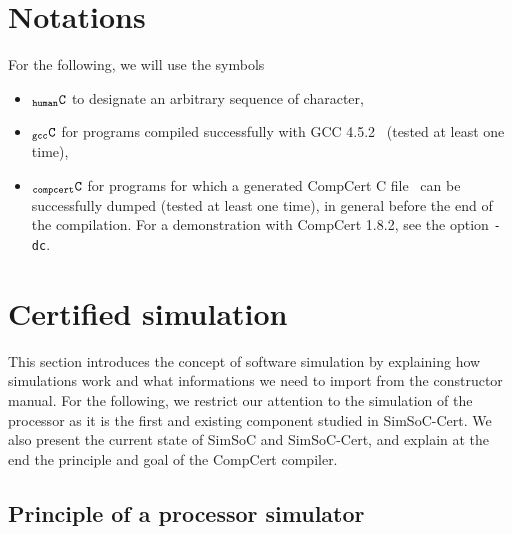 \documentclass[a4paper, 11pt]{article}
\newcommand{\gcc}{GCC 4.5.2\xspace}
\newcommand{\compcert}{CompCert 1.8.2\xspace}
\newcommand{\C}{$_{\tt compcert}{\tt C}$\xspace}
\newcommand{\gccC}{$_{\tt gcc}{\tt C}$\xspace}
\newcommand{\hC}{$_{\tt human}{\tt C}$\xspace}
\newcommand{\simsoc}{SimSoC\xspace}
\newcommand{\SScert}{SimSoC-Cert\xspace}
\begin{document}
\section*{Notations}
For the following, we will use the symbols
\begin{itemize}
\item \hC to designate an arbitrary sequence of character, 
\item \gccC for programs compiled successfully with \gcc~\cite{gcc} (tested at least one time),
\item \C for programs for which a generated CompCert C file~\cite{Leroy-Compcert-CACM} can be successfully dumped (tested at least one time), in general before the end of the compilation. For a demonstration with \compcert, see the option \verb|-dc|.
\end{itemize}

\section{Certified simulation}
\label{s:certi_sim}

This section introduces the concept of software simulation by explaining how simulations work and what informations we need to import from the constructor manual. For the following, we restrict our attention to the simulation of the processor as it is the first and existing component studied in \SScert. We also present the current state of \simsoc and \SScert, and explain at the end the principle and goal of the CompCert compiler.

\subsection{Principle of a processor simulator}

\end{document}
